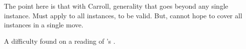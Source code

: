 \section{\citeauthor{Carroll:1895uj}}

\nocite{Black:1951aa}

\begin{note}
  The point here is that with Carroll, generality that goes beyond any single instance.
  Must apply to all instances, to be valid.
  But, cannot hope to cover all instances in a single move.
\end{note}

\begin{note}
  A difficulty found on a reading of \citeauthor{Carroll:1895uj}'s .
\end{note}

